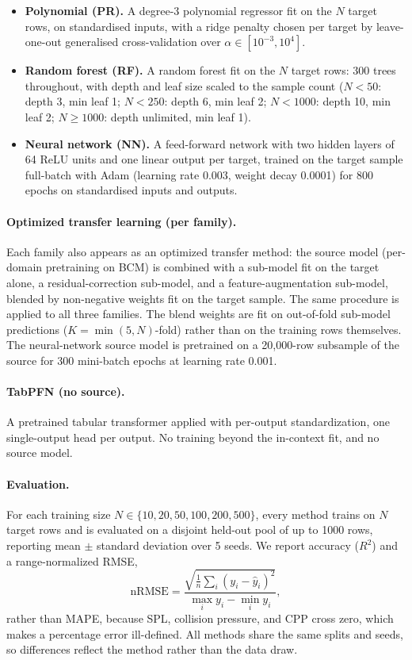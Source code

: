 \documentclass[11pt]{article}
\begin{document}
\begin{itemize}
  \item \textbf{Polynomial (PR).} A degree-3 polynomial regressor
  fit on the $N$ target rows, on standardised inputs, with a ridge penalty chosen
  per target by leave-one-out generalised cross-validation over
  $\alpha \in [10^{-3}, 10^{4}]$.
  \item \textbf{Random forest (RF).} A random forest fit on the $N$ target rows:
  300 trees throughout, with depth and leaf size scaled to the sample
  count ($N<50$: depth 3, min leaf 1; $N<250$: depth 6, min leaf 2; $N<1000$: depth 10, min leaf 2; $N\ge1000$: depth unlimited, min leaf 1).
  \item \textbf{Neural network (NN).} A feed-forward network with two hidden
  layers of 64 ReLU units and one linear output per target, trained on
  the target sample full-batch with Adam (learning rate 0.003, weight decay
  0.0001) for 800 epochs on standardised inputs and outputs.
\end{itemize}

\paragraph{Optimized transfer learning (per family).}
Each family also appears as an optimized transfer method: the source model
(per-domain pretraining on BCM) is combined with a sub-model fit on the target
alone, a residual-correction sub-model, and a feature-augmentation sub-model,
blended by non-negative weights fit on the target sample. The same procedure is
applied to all three families. The blend weights are fit on out-of-fold sub-model
predictions ($K = \min(5, N)$-fold) rather than on the training rows themselves.
The neural-network source model is pretrained on a
20,000-row subsample of the source for 300 mini-batch
epochs at learning rate 0.001.

\paragraph{TabPFN (no source).}
A pretrained tabular transformer applied with per-output standardization, one
single-output head per output. No training beyond the in-context fit, and no
source model.

\paragraph{Evaluation.}
For each training size $N \in \{10, 20, 50, 100, 200, 500\}$, every method trains on $N$ target
rows and is evaluated on a disjoint held-out pool of up to 1000 rows,
reporting mean $\pm$ standard deviation over 5 seeds. We report
accuracy ($R^2$) and a range-normalized RMSE,
\begin{equation}
\mathrm{nRMSE} = \frac{\sqrt{\frac{1}{n}\sum_i (y_i - \hat{y}_i)^2}}
                      {\max_i y_i - \min_i y_i},
\end{equation}
rather than MAPE, because SPL, collision pressure, and CPP cross zero, which
makes a percentage error ill-defined. All methods share the same splits and
seeds, so differences reflect the method rather than the data draw.
\end{document}
